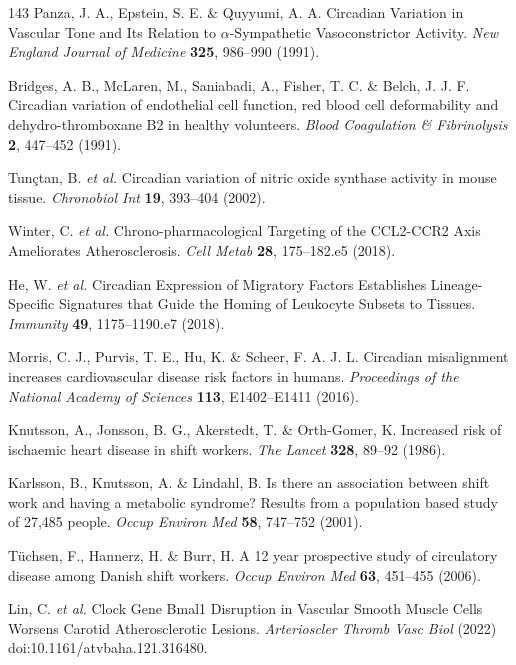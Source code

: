 \documentclass[12pt]{article}
\begin{document}
\begin{thebibliography}{143}
 Panza, J. A., Epstein, S. E. \& Quyyumi, A. A. Circadian Variation in Vascular Tone and Its Relation to $\alpha$-Sympathetic Vasoconstrictor Activity. \textit{New England Journal of Medicine} \textbf{325}, 986--990 (1991).

 Bridges, A. B., McLaren, M., Saniabadi, A., Fisher, T. C. \& Belch, J. J. F. Circadian variation of endothelial cell function, red blood cell deformability and dehydro-thromboxane B2 in healthy volunteers. \textit{Blood Coagulation \& Fibrinolysis} \textbf{2}, 447--452 (1991).

 Tunçtan, B. \textit{et al.} Circadian variation of nitric oxide synthase activity in mouse tissue. \textit{Chronobiol Int} \textbf{19}, 393--404 (2002).

 Winter, C. \textit{et al.} Chrono-pharmacological Targeting of the CCL2-CCR2 Axis Ameliorates Atherosclerosis. \textit{Cell Metab} \textbf{28}, 175--182.e5 (2018).

 He, W. \textit{et al.} Circadian Expression of Migratory Factors Establishes Lineage-Specific Signatures that Guide the Homing of Leukocyte Subsets to Tissues. \textit{Immunity} \textbf{49}, 1175--1190.e7 (2018).

 Morris, C. J., Purvis, T. E., Hu, K. \& Scheer, F. A. J. L. Circadian misalignment increases cardiovascular disease risk factors in humans. \textit{Proceedings of the National Academy of Sciences} \textbf{113}, E1402--E1411 (2016).

 Knutsson, A., Jonsson, B. G., Akerstedt, T. \& Orth-Gomer, K. Increased risk of ischaemic heart disease in shift workers. \textit{The Lancet} \textbf{328}, 89--92 (1986).

 Karlsson, B., Knutsson, A. \& Lindahl, B. Is there an association between shift work and having a metabolic syndrome? Results from a population based study of 27,485 people. \textit{Occup Environ Med} \textbf{58}, 747--752 (2001).

 Tüchsen, F., Hannerz, H. \& Burr, H. A 12 year prospective study of circulatory disease among Danish shift workers. \textit{Occup Environ Med} \textbf{63}, 451--455 (2006).

 Lin, C. \textit{et al.} Clock Gene Bmal1 Disruption in Vascular Smooth Muscle Cells Worsens Carotid Atherosclerotic Lesions. \textit{Arterioscler Thromb Vasc Biol} (2022) doi:10.1161/atvbaha.121.316480.


\end{thebibliography}
\end{document}
